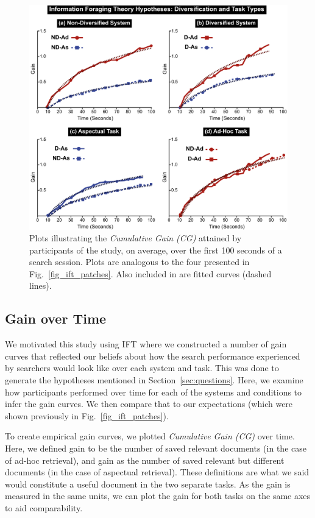 \begin{figure}[t!]
\includegraphics[width=\textwidth]{figures/cg-stretched.pdf}
\caption{Plots illustrating the \emph{Cumulative Gain (CG)} attained by participants of the study, on average, over the first 100 seconds of a search session. Plots are analogous to the four presented in Fig.~\ref{fig_ift_patches}. Also included in are fitted curves (dashed lines).} \label{fig_cg}
\end{figure}

\subsection{Gain over Time}
We motivated this study using IFT where we constructed a number of gain curves that reflected our beliefs about how the search performance experienced by searchers would look like over each system and task. This was done to generate the hypotheses mentioned in Section~\ref{sec:questions}. Here, we examine how participants performed over time for each of the systems and conditions to infer the gain curves. We then compare that to our expectations (which were shown previously in Fig.~\ref{fig_ift_patches}).

To create empirical gain curves, we plotted \emph{Cumulative Gain (CG)} over time. Here, we defined gain to be the number of saved relevant documents (in the case of ad-hoc retrieval), and gain as the number of saved relevant but different documents (in the case of aspectual retrieval). These definitions are what we said would constitute a useful document in the two separate tasks. As the gain is measured in the same units, we can plot the gain for both tasks on the same axes to aid comparability.

